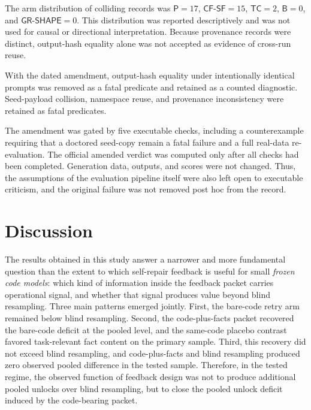 \documentclass{article}
\numberwithin{equation}{section}  %
\newcommand{\fitwidth}[1]{\resizebox{\ifdim\width>\linewidth \linewidth\else\width\fi}{!}{#1}}
\theoremstyle{definition}
\newcommand{\armP}{\textsf{P}}
\newcommand{\armB}{\textsf{B}}
\newcommand{\armTC}{\textsf{TC}}
\newcommand{\armCF}{\textsf{CF-SF}}
\newcommand{\armGR}{\textsf{GR-SHAPE}}
\begin{document}
The arm distribution of colliding records was
$\armP=17$, $\armCF=15$, $\armTC=2$, $\armB=0$, and $\armGR=0$.
This distribution was reported descriptively and was not used for causal or directional
interpretation. Because provenance records were distinct, output-hash equality alone was not
accepted as evidence of cross-run reuse.

With the dated amendment, output-hash equality under intentionally identical prompts was
removed as a fatal predicate and retained as a counted diagnostic. Seed-payload collision,
namespace reuse, and provenance inconsistency were retained as fatal predicates.

The amendment was gated by five executable checks, including a counterexample requiring that a
doctored seed-copy remain a fatal failure and a full real-data re-evaluation. The official
amended verdict was computed only after all checks had been completed. Generation data,
outputs, and scores were not changed. Thus, the assumptions of the evaluation pipeline itself
were also left open to executable criticism, and the original failure was not removed post hoc
from the record.

\begin{table}[t]
\centering
\caption{Verdict status by layer. Statistical verdicts and audit verdicts are reported
separately. Original as-frozen AUDIT-FAILURE statuses are preserved. Dated amendments do not
have the same evidential weight as untouched preregistration.}
\label{tab:verdictstatus}
\fitwidth{}
\end{table}

\section{Discussion}
\label{sec:discussion}

The results obtained in this study answer a narrower and more fundamental question than the
extent to which self-repair feedback is useful for small \emph{frozen code models}: which
kind of information inside the feedback packet carries operational signal, and whether that
signal produces value beyond blind resampling. Three main patterns emerged
jointly. First, the bare-code retry arm remained below blind resampling. Second, the
code-plus-facts packet recovered the bare-code deficit at the pooled level, and the same-code
placebo contrast favored task-relevant fact content on the primary sample. Third, this recovery
did not exceed blind resampling, and code-plus-facts and blind resampling produced zero
observed pooled difference in the tested sample. Therefore, in the tested regime, the observed
function of feedback design was not to produce additional pooled unlocks over blind
resampling, but to close the pooled unlock deficit induced by the code-bearing packet.
\end{document}
